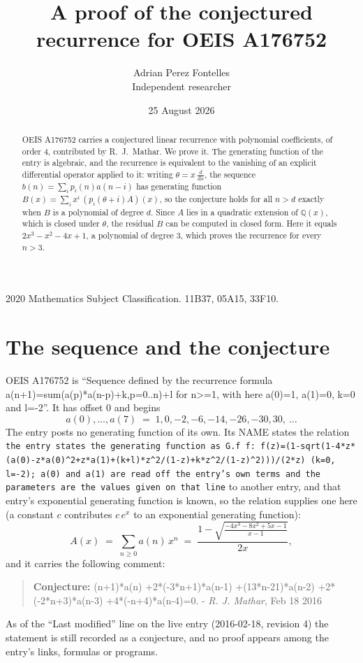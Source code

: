 \documentclass[11pt,a4paper]{article}
\title{A proof of the conjectured recurrence for OEIS A176752}
\author{Adrian Perez Fontelles\\ \small Independent researcher}
\date{25 August 2026}
\theoremstyle{plain}
\theoremstyle{definition}
\begin{document}
\maketitle

\begin{abstract}
OEIS A176752 carries a conjectured linear recurrence with polynomial coefficients, of
order 4, contributed by R.~J.~Mathar. We prove it. The generating function of the
entry is algebraic, and the recurrence is equivalent to the vanishing of an explicit
differential operator applied to it: writing $\theta=x\,\frac{d}{dx}$, the sequence
$b(n)=\sum_{i}p_{i}(n)a(n-i)$ has generating function
$B(x)=\sum_{i}x^{i}\,(p_{i}(\theta+i)A)(x)$, so the conjecture holds for all $n>d$ exactly
when $B$ is a polynomial of degree $d$. Since $A$ lies in a quadratic extension of
$\mathbb{Q}(x)$, which is closed under $\theta$, the residual $B$ can be computed in
closed form. Here it equals $2 x^{3} - x^{2} - 4 x + 1$, a polynomial of degree $3$, which proves
the recurrence for every $n>3$.
\end{abstract}

\noindent\small 2020 Mathematics Subject Classification. 11B37, 05A15, 33F10.\normalsize

\section{The sequence and the conjecture}

OEIS A176752 is ``Sequence defined by the recurrence formula a(n+1)=sum(a(p)*a(n-p)+k,p=0..n)+l for n>=1, with here a(0)=1, a(1)=0, k=0 and l=-2''. It has offset $0$ and begins
\[
a(0),\dots,a(7)\;=\;1, 0, -2, -6, -14, -26, -30, 30,\ \dots
\]
The entry posts no generating function of its own. Its NAME states the
relation \texttt{the entry states the generating function as G.f f: f(z)=(1-sqrt(1-4*z*(a(0)-z*a(0)\textasciicircum{}2+z*a(1)+(k+l)*z\textasciicircum{}2/(1-z)+k*z\textasciicircum{}2/(1-z)\textasciicircum{}2)))/(2*z) (k=0, l=-2); a(0) and a(1) are read off the entry's own terms and the parameters are the values given on that line} to another entry, and that entry's exponential generating
function is known, so the relation supplies one here (a constant $c$ contributes
$c\,e^{x}$ to an exponential generating function):
\begin{equation}\label{eq:gf}
A(x)\;=\;\sum_{n\ge 0} a(n)\,x^{n}\;=\;\frac{1 - \sqrt{\frac{- 4 x^{3} - 8 x^{2} + 5 x - 1}{x - 1}}}{2 x} ,
\end{equation}
and it carries the following comment:
\begin{quote}\small
\textbf{Conjecture:} (n+1)*a(n) +2*(-3*n+1)*a(n-1) +(13*n-21)*a(n-2) +2*(-2*n+3)*a(n-3) +4*(-n+4)*a(n-4)=0. - \emph{R. J. Mathar}, Feb 18 2016
\end{quote}
As of the ``Last modified'' line on the live entry (2016-02-18, revision 4) the
statement is still recorded as a conjecture, and no proof appears among the entry's links,
formulas or programs.
\end{document}
